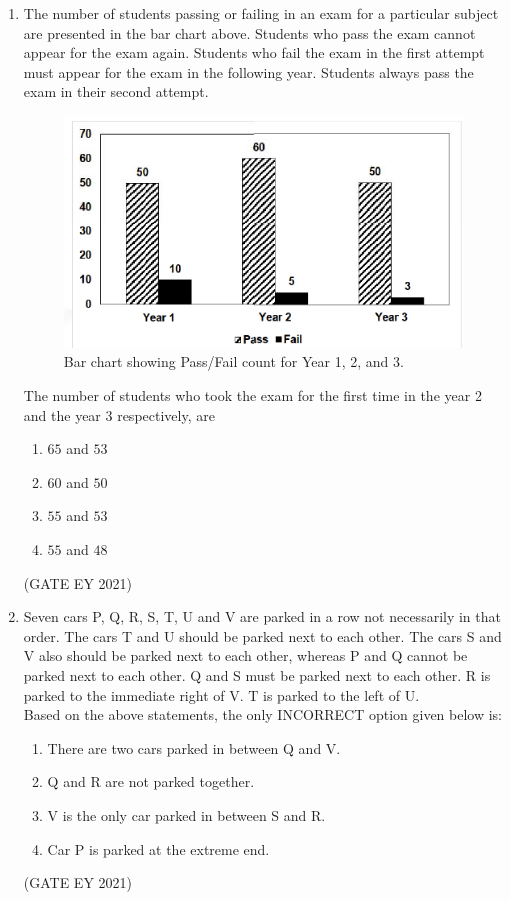 \documentclass[journal]{IEEEtran}
\begin{document}
\begin{enumerate}
    \item The number of students passing or failing in an exam for a particular subject are presented in the bar chart above. Students who pass the exam cannot appear for the exam again. Students who fail the exam in the first attempt must appear for the exam in the following year. Students always pass the exam in their second attempt.
    \begin{figure}[!h]
        \centering
        \includegraphics[width=0.3\columnwidth]{figs/Q.9.png}
        \caption{Bar chart showing Pass/Fail count for Year 1, 2, and 3.}
    \end{figure}
    The number of students who took the exam for the first time in the year 2 and the year 3 respectively, are
    \begin{multicols}{2}
    \begin{enumerate}
        \item $65$ and $53$
        \item $60$ and $50$
        \item $55$ and $53$
        \item $55$ and $48$
    \end{enumerate}
    \end{multicols}
    \hfill{(GATE EY 2021)}

    \item Seven cars P, Q, R, S, T, U and V are parked in a row not necessarily in that order. The cars T and U should be parked next to each other. The cars S and V also should be parked next to each other, whereas P and Q cannot be parked next to each other. Q and S must be parked next to each other. R is parked to the immediate right of V. T is parked to the left of U. \\
    Based on the above statements, the only INCORRECT option given below is:
    \begin{enumerate}
        \item There are two cars parked in between Q and V.
        \item Q and R are not parked together.
        \item V is the only car parked in between S and R.
        \item Car P is parked at the extreme end.
    \end{enumerate}
    \hfill{(GATE EY 2021)}

\end{enumerate}
\clearpage
\end{document}
